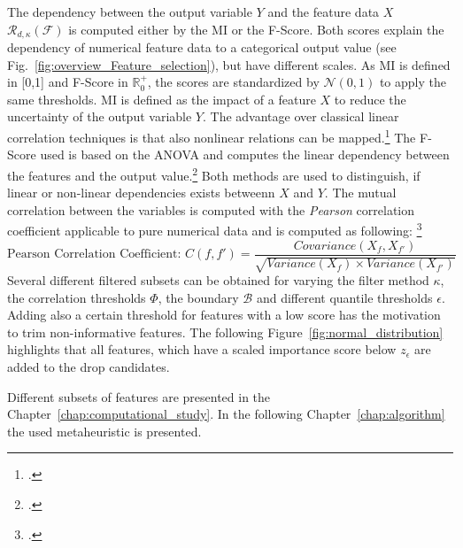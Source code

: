 The dependency between the output variable $Y$ and the feature data $X$ $\mathcal{R}_{d,\kappa}(\mathcal{F})$ is computed either by the
\gls{MI} or the \gls{F-Score}. Both scores explain the dependency of numerical feature data to a categorical output value (see Fig.~\ref{fig:overview_Feature_selection}),
but have different scales. As \gls{MI} is defined in [0,1] and \gls{F-Score} in $\mathbb{R}_0^+$, the scores are standardized by $\mathcal{N}(0,1)$ to
apply the same thresholds. \gls{MI} is defined as the impact of a feature $X$ to reduce the uncertainty of the output variable $Y$.
The advantage over classical linear correlation techniques is that also nonlinear relations can be mapped.\footcite[cf.][pp.539-539]{battiti_using_1994}
The \gls{F-Score} used is based on the \gls{ANOVA} and computes the linear dependency between the features and the output value.\footcite[cf.][p.2]{gu_generalized_2012}
Both methods are used to distinguish, if linear or non-linear dependencies exists betweenn $X$ and $Y$. The mutual correlation between the variables
is computed with the \textit{Pearson} correlation coefficient applicable to pure numerical data and is computed as following: \footcite[cf.][p.17]{chandrashekar_survey_2014}
\begin{equation}
    \text{Pearson Correlation Coefficient: }C(f,f') = \frac{Covariance(X_f,X_{f'})}{\sqrt{Variance(X_f)\times Variance(X_{f'})}}
\end{equation}
Several different filtered subsets can be obtained for varying the filter method $\kappa$, the correlation thresholds $\Phi$, the boundary $\mathcal{B}$ and
different quantile thresholds $\epsilon$. Adding also a certain threshold for features with a low score has the motivation to trim non-informative features.
The following Figure~\ref{fig:normal_distribution} highlights that all features, which have a scaled importance score below $z_{\epsilon}$ are added to the drop candidates.



Different subsets of features are presented in the Chapter~\ref{chap:computational_study}. In the following Chapter~\ref{chap:algorithm}
the used metaheuristic is presented.